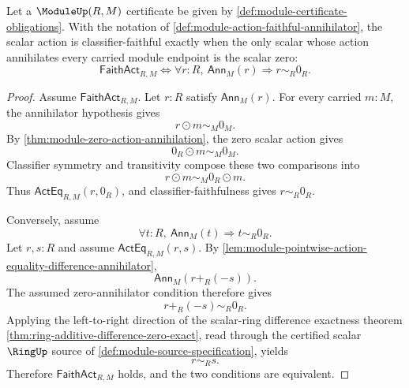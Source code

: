 \begin{theorem}
\label{thm:module-faithful-action-iff-zero-annihilator}
Let a $\ModuleUp(R,M)$ certificate be given by \autoref{def:module-certificate-obligations}. With the notation of \autoref{def:module-action-faithful-annihilator}, the scalar action is classifier-faithful exactly when the only scalar whose action annihilates every carried module endpoint is the scalar zero:
$$
\mathsf{FaithAct}_{R,M}
\Longleftrightarrow
\forall r:R,\ \mathsf{Ann}_M(r)\Longrightarrow r\sim_R 0_R.
$$
\end{theorem}
\begin{proof}
Assume $\mathsf{FaithAct}_{R,M}$. Let $r:R$ satisfy $\mathsf{Ann}_M(r)$. For every carried $m:M$, the annihilator hypothesis gives
$$
r\odot m\sim_M 0_M.
$$
By \autoref{thm:module-zero-action-annihilation}, the zero scalar action gives
$$
0_R\odot m\sim_M 0_M.
$$
Classifier symmetry and transitivity compose these two comparisons into
$$
r\odot m\sim_M 0_R\odot m.
$$
Thus $\mathsf{ActEq}_{R,M}(r,0_R)$, and classifier-faithfulness gives $r\sim_R 0_R$.

Conversely, assume
$$
\forall t:R,\ \mathsf{Ann}_M(t)\Longrightarrow t\sim_R 0_R.
$$
Let $r,s:R$ and assume $\mathsf{ActEq}_{R,M}(r,s)$. By \autoref{lem:module-pointwise-action-equality-difference-annihilator},
$$
\mathsf{Ann}_M(r+_R(-s)).
$$
The assumed zero-annihilator condition therefore gives
$$
r+_R(-s)\sim_R 0_R.
$$
Applying the left-to-right direction of the scalar-ring difference exactness theorem \autoref{thm:ring-additive-difference-zero-exact}, read through the certified scalar $\RingUp$ source of \autoref{def:module-source-specification}, yields
$$
r\sim_R s.
$$
Therefore $\mathsf{FaithAct}_{R,M}$ holds, and the two conditions are equivalent.
\end{proof}



